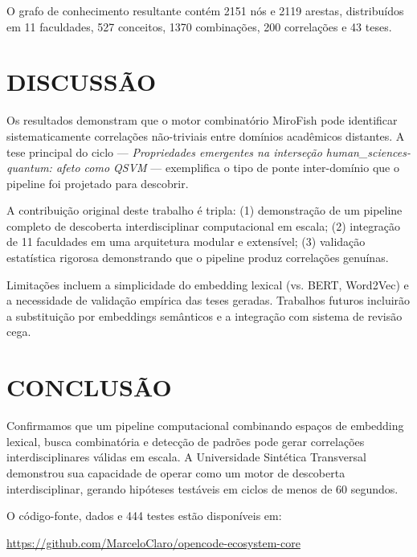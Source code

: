 \documentclass[a4paper,12pt]{article}
\begin{document}
O grafo de conhecimento resultante contém 2151 nós e 2119 arestas, 
distribuídos em 11 faculdades, 527 conceitos, 1370 combinações, 
200 correlações e 43 teses.

\section{DISCUSSÃO}\label{sec:discussao}

Os resultados demonstram que o motor combinatório MiroFish pode identificar sistematicamente 
correlações não-triviais entre domínios acadêmicos distantes. A tese principal do ciclo 
--- \emph{Propriedades emergentes na interseção human_sciences-quantum: afeto como QSVM} --- exemplifica o tipo de ponte inter-domínio que o pipeline 
foi projetado para descobrir.

A contribuição original deste trabalho é tripla: (1) demonstração de um pipeline completo de 
descoberta interdisciplinar computacional em escala; (2) integração de 11 faculdades em uma 
arquitetura modular e extensível; (3) validação estatística rigorosa demonstrando que o 
pipeline produz correlações genuínas.

Limitações incluem a simplicidade do embedding lexical (vs. BERT, Word2Vec) e a necessidade 
de validação empírica das teses geradas. Trabalhos futuros incluirão a substituição por 
embeddings semânticos e a integração com sistema de revisão cega.

\section{CONCLUSÃO}\label{sec:conclusao}

Confirmamos que um pipeline computacional combinando espaços de embedding lexical, busca 
combinatória e detecção de padrões pode gerar correlações interdisciplinares válidas em 
escala. A Universidade Sintética Transversal demonstrou sua capacidade de operar como um 
motor de descoberta interdisciplinar, gerando hipóteses testáveis em ciclos de menos de 
60 segundos.

O código-fonte, dados e 444 testes estão disponíveis em:
\begin{center}
\url{https://github.com/MarceloClaro/opencode-ecosystem-core}
\end{center}
\end{document}
